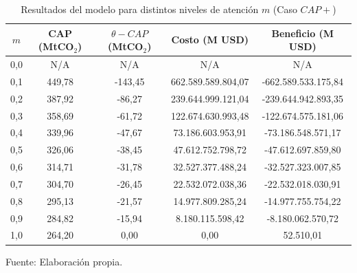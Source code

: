 
\begin{table}[H]
\centering
\small
\caption{Resultados del modelo para distintos niveles de atención $m$ (Caso $CAP+$)}
\label{tab:resultados_m}
\renewcommand{\arraystretch}{1.1}
\setlength{\tabcolsep}{6pt}
\begin{tabular}{ccccc}
\toprule
$m$ & CAP (MtCO$_2$) & $\theta-CAP$ (MtCO$_2$) & Costo (M USD) & Beneficio (M USD) \\
\midrule
0,0 & N/A & N/A & N/A & N/A \\
0,1 & 449,78 & -143,45 & 662.589.589.804,07 & -662.589.533.175,84 \\
0,2 & 387,92 & -86,27 & 239.644.999.121,04 & -239.644.942.893,35 \\
0,3 & 358,69 & -61,72 & 122.674.630.993,48 & -122.674.575.181,06 \\
0,4 & 339,96 & -47,67 & 73.186.603.953,91 & -73.186.548.571,17 \\
0,5 & 326,06 & -38,45 & 47.612.752.798,72 & -47.612.697.859,80 \\
0,6 & 314,71 & -31,78 & 32.527.377.488,24 & -32.527.323.007,85 \\
0,7 & 304,70 & -26,45 & 22.532.072.038,36 & -22.532.018.030,91 \\
0,8 & 295,13 & -21,57 & 14.977.809.285,24 & -14.977.755.754,22 \\
0,9 & 284,82 & -15,94 & 8.180.115.598,42 & -8.180.062.570,72 \\
1,0 & 264,20 & 0,00 & 0,00 & 52.510,01 \\
\bottomrule
\end{tabular}

\vspace{0.3cm}
\footnotesize Fuente: Elaboración propia.

\end{table}

\vspace{0.5cm}

